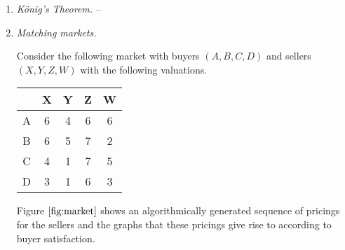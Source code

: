 \documentclass[letterpaper,11pt]{article}
\newcommand{\questionname}{\textit}
\newcommand{\fin}{\mathbf}
\begin{document}
\begin{enumerate}
\begin{proof}
            Since there are $2^k$ choices for the function $f$ and two ways to
            construct $g$ given $f$, there are $2^{k+1}$ injective maps from
            $\fin{k+1}$ to $\fin{k+2}$.

            Hence by induction, for any $n$, the number of injective functions
            from $\fin{n}$ to $\fin{n+1}$ is $2^n$. By the correspondence
            between matchings covering $A$ on bipartite graphs of the form of
            $G$ and injective functions on finite sets, there are $2^n$
            matchings covering $A$ on $G$.
        \end{proof}

    \item
        \questionname{K\"onig's Theorem.} --

    \item
        \questionname{Matching markets.}

        Consider the following market with buyers $(A,B,C,D)$ and sellers
        $(X,Y,Z,W)$ with the following valuations.

        \begin{center}
            \begin{tabular}{c | c c c c}
                ~ & X & Y & Z & W \\ \hline
                A & 6 & 4 & 6 & 6 \\
                B & 6 & 5 & 7 & 2 \\
                C & 4 & 1 & 7 & 5 \\
                D & 3 & 1 & 6 & 3
            \end{tabular}
        \end{center}

        Figure $\ref{fig:market}$ shows an algorithmically generated sequence
        of pricings for the sellers and the graphs that these pricings give
        rise to according to buyer satisfaction.

        \newcommand{\marketmatrix}{
            \matrix[market]{
                \node (A) {$A$} ; \& \node (X) {$X$} ; \\
                \node (B) {$B$} ; \& \node (Y) {$Y$} ; \\
                \node (C) {$C$} ; \& \node (Z) {$Z$} ; \\
                \node (D) {$D$} ; \& \node (W) {$W$} ; \\
            }
        }

        \newcommand{\marketgraph}[1]{
            \begin{tikzpicture}[ampersand replacement=\&]
                \marketmatrix ;
                \graph[use existing nodes, right anchor=west, left anchor=east]{
                    #1
                } ;
            \end{tikzpicture}
        }


\end{enumerate}
\end{document}
